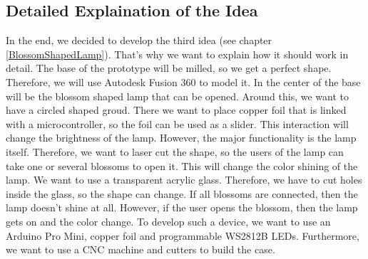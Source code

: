 \documentclass[doc.tex]{subfiles}
\begin{document}
    \subsection{Detailed Explaination of the Idea}
        \begin{flushleft}
            In the end, we decided to develop the third idea (see chapter \ref{BlossomShapedLamp}). That's why we want to explain 
            how it should work in detail. \newline
            The base of the prototype will be milled, so we get a perfect shape. Therefore, we will use Autodesk Fusion 360\cite{autodeskFusion360}
            to model it. In the center of the base will be the blossom shaped lamp that can be opened. Around this, we want to have a 
            circled shaped groud. There we want to place copper foil that is linked with a microcontroller, %
            so the foil can be used as a slider. This interaction will change the brightness of the lamp. \newline
            However, the major functionality is the lamp itself. Therefore, we want to laser cut the shape, so the users of the lamp can
            take one or several blossoms to open it. This will change the color shining of the lamp. We want to use a transparent acrylic glass.
            Therefore, we have to cut holes inside the glass, so the shape can change.  \newline
            If all blossoms are connected, then the lamp doesn't shine at all. However, if the user opens the blossom, then the lamp gets on
            and the color change. 
            \newline
            \newline
            To develop such a device, we want to use an Arduino Pro Mini, copper foil and programmable WS2812B LEDs.
            Furthermore, we want to use a CNC machine and cutters to build the case.
        \end{flushleft}
\end{document}

